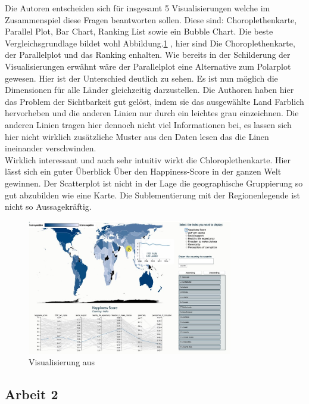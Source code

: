 Die Autoren entscheiden sich für insgesamt 5 Visualisierungen welche im Zusammenspiel diese Fragen beantworten sollen. Diese sind: Choroplethenkarte, Parallel Plot, Bar Chart, Ranking List sowie ein Bubble Chart. 
Die beste Vergleichsgrundlage bildet wohl Abbildung.\ref{fig:bazurto} , hier sind 
Die Choroplethenkarte, der Parallelplot und das Ranking enhalten. 
Wie bereits in der Schilderung der Visualisierungen erwähnt wäre der Parallelplot eine Alternative zum Polarplot gewesen. Hier ist der Unterschied deutlich zu sehen.
Es ist nun möglich die Dimensionen für alle Länder gleichzeitig darzustellen. Die Authoren haben hier das Problem der Sichtbarkeit gut gelöst, indem sie das ausgewählte Land Farblich hervorheben und die anderen Linien nur durch ein leichtes grau einzeichnen. Die anderen Linien tragen hier dennoch nicht viel Informationen bei, es lassen sich hier nicht wirklich zusätzliche Muster aus den Daten lesen das die Linen ineinander verschwinden.\\

Wirklich interessant und auch sehr intuitiv wirkt die Chloroplethenkarte. Hier lässt sich ein guter Überblick Über den Happiness-Score in der ganzen Welt gewinnen. Der Scatterplot ist nicht in der Lage die geographische Gruppierung so gut abzubilden wie eine Karte. Die Sublementierung mit der Regionenlegende ist nicht so Aussagekräftig. 

\cite{bazurto2019}
\begin{figure}[h]
 \centering
 \includegraphics[width = 0.8\textwidth]{img/bazurto_vis.jpg}
 \caption{Visualisierung aus \textcite{bazurto2019}}
 \label{fig:bazurto}
\end{figure}

\subsection{Arbeit 2}
